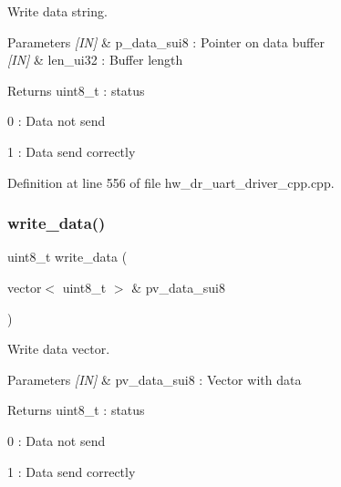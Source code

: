 Write data string. 


\begin{DoxyParams}{Parameters}
{\em \mbox{[}\+I\+N\mbox{]}} & p\+\_\+data\+\_\+sui8 \+: Pointer on data buffer \\
\hline
{\em \mbox{[}\+I\+N\mbox{]}} & len\+\_\+ui32 \+: Buffer length \\
\hline
\end{DoxyParams}
\begin{DoxyReturn}{Returns}
uint8\+\_\+t \+: status \begin{DoxyItemize}
\item 0 \+: Data not send \item 1 \+: Data send correctly \end{DoxyItemize}

\end{DoxyReturn}


Definition at line 556 of file hw\+\_\+dr\+\_\+uart\+\_\+driver\+\_\+cpp.\+cpp.

\mbox{\label{group___u_a_r_t_ga22e5e9630a59690dec95bfc1203485db}} 
\subsubsection{write\_data()\hspace{0.1cm}{\footnotesize\ttfamily [3/3]}}
{\footnotesize\ttfamily uint8\+\_\+t write\+\_\+data (\begin{DoxyParamCaption}\item[{vector$<$ uint8\+\_\+t $>$ \&}]{pv\+\_\+data\+\_\+sui8 }\end{DoxyParamCaption})}



Write data vector. 


\begin{DoxyParams}{Parameters}
{\em \mbox{[}\+I\+N\mbox{]}} & pv\+\_\+data\+\_\+sui8 \+: Vector with data \\
\hline
\end{DoxyParams}
\begin{DoxyReturn}{Returns}
uint8\+\_\+t \+: status \begin{DoxyItemize}
\item 0 \+: Data not send \item 1 \+: Data send correctly \end{DoxyItemize}

\end{DoxyReturn}


